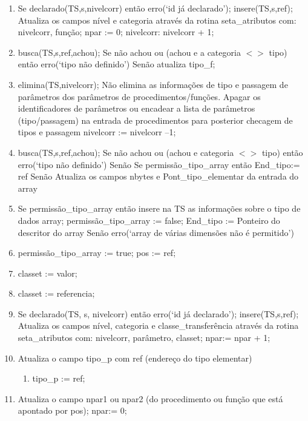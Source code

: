 \documentclass[a4paper,12pt]{article}
\begin{document}
\begin{enumerate}
	\item  Se declarado(TS,s,nivelcorr) então erro(‘id já declarado’);
insere(TS,s,ref);
Atualiza os campos nível e categoria através da rotina seta\_atributos com: nivelcorr, função;
npar := 0;
nivelcorr: nivelcorr + 1;

	\item busca(TS,s,ref,achou);
Se não achou ou (achou e a categoria $<>$ tipo) então erro(‘tipo não definido’)
Senão atualiza tipo\_f;

	\item elimina(TS,nivelcorr);
{Não elimina as informações de tipo e passagem de parâmetros dos parâmetros de procedimentos/funções.
Apagar os identificadores de parâmetros ou encadear a lista de parâmetros (tipo/passagem) na entrada de
procedimentos para posterior checagem de tipos e passagem}
nivelcorr := nivelcorr –1;

	\item  busca(TS,s,ref,achou);
Se não achou ou (achou e categoria $<>$ tipo) então erro(‘tipo não definido’)
Senão Se permissão\_tipo\_array então End\_tipo:= ref
 Senão Atualiza os campos nbytes e Pont\_tipo\_elementar da entrada do array 
 
 	\item  Se permissão\_tipo\_array então
 insere na TS as informações sobre o tipo de dados array;
 permissão\_tipo\_array := false;
 End\_tipo := Ponteiro do descritor do array
 Senão erro(‘array de várias dimensões não é permitido’)
 
 	\item permissão\_tipo\_array := true;
 pos := ref;
 
 	\item classet := valor;
    
    \item classet := referencia;
    
    \item Se declarado(TS, s, nivelcorr) então erro(‘id já declarado’);
insere(TS,s,ref); Atualiza os campos nível, categoria e classe\_transferência através da rotina seta\_atributos com:
nivelcorr, parâmetro, classet;
npar:= npar + 1;

	\item Atualiza o campo tipo\_p com ref (endereço do tipo elementar)
    \begin{enumerate}
    \item tipo\_p := ref;
    \end{enumerate}
    
    \item Atualiza o campo npar1 ou npar2 (do procedimento ou função que está apontado por pos);
npar:= 0;


\end{enumerate}
\end{document}

